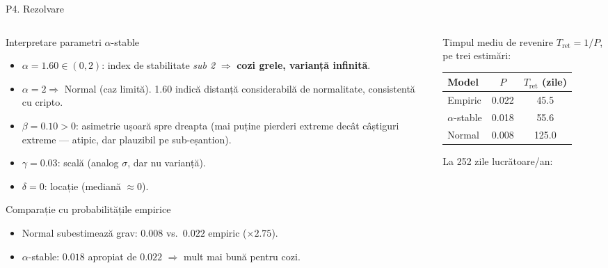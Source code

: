 \documentclass[9pt, aspectratio=169, t]{beamer}
\begin{document}
\begin{frame}[shrink=22]{P4. Rezolvare}
\begin{columns}[T]
\begin{column}{0.5\textwidth}
\begin{block}{Interpretare parametri $\alpha$-stable}
\begin{itemize}\setlength{\itemsep}{1pt}
    \item $\alpha=1.60 \in (0,2)$: index de stabilitate \emph{sub 2} $\Rightarrow$ \textbf{cozi grele, varianță infinită}.
    \item $\alpha = 2 \Rightarrow$ Normal (caz limită). 1.60 indică distanță considerabilă de normalitate, consistentă cu cripto.
    \item $\beta=0.10>0$: asimetrie ușoară spre dreapta (mai puține pierderi extreme decât câștiguri extreme --- atipic, dar plauzibil pe sub-eșantion).
    \item $\gamma=0.03$: scală (analog $\sigma$, dar nu varianță).
    \item $\delta=0$: locație (mediană $\approx 0$).
\end{itemize}
\end{block}
\begin{block}{Comparație cu probabilitățile empirice}
\begin{itemize}\setlength{\itemsep}{1pt}
    \item Normal subestimează grav: $0.008$ vs.\ $0.022$ empiric ($\times 2.75$).
    \item $\alpha$-stable: $0.018$ apropiat de $0.022$ $\Rightarrow$ mult mai bună pentru cozi.
\end{itemize}
\end{block}
\end{column}
\begin{column}{0.48\textwidth}
\begin{block}{Timpul mediu de revenire}
$T_{\text{ret}} = 1/P$, pe trei estimări:
\begin{center}\small
\begin{tabular}{lcc}\toprule
Model & $P$ & $T_{\text{ret}}$ (zile)\\\midrule
Empiric    & 0.022 & 45.5\\
$\alpha$-stable & 0.018 & 55.6\\
Normal     & 0.008 & 125.0\\\bottomrule
\end{tabular}
\end{center}
La 252 zile lucrătoare/an:
\begin{itemize}\setlength{\itemsep}{1pt}

\end{itemize}
\end{block}
\end{column}
\end{columns}
\end{frame}
\end{document}

